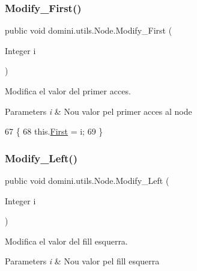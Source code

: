 \subsubsection{\texorpdfstring{Modify\+\_\+\+First()}{Modify\_First()}}
{\footnotesize\ttfamily public void domini.\+utils.\+Node.\+Modify\+\_\+\+First (\begin{DoxyParamCaption}\item[{Integer}]{i }\end{DoxyParamCaption})\hspace{0.3cm}{\ttfamily [inline]}}



Modifica el valor del primer acces. 


\begin{DoxyParams}{Parameters}
{\em i} & Nou valor pel primer acces al node \\
\hline
\end{DoxyParams}

\begin{DoxyCode}
67                                         \{
68         this.\hyperlink{classdomini_1_1utils_1_1Node_a42db9f259f129c72cab2052a0f8ba42a}{First} = i;
69     \}
\end{DoxyCode}
\mbox{\label{classdomini_1_1utils_1_1Node_a5a1cbd1e7f1fd78b42050f563520a709}} 
\subsubsection{\texorpdfstring{Modify\+\_\+\+Left()}{Modify\_Left()}}
{\footnotesize\ttfamily public void domini.\+utils.\+Node.\+Modify\+\_\+\+Left (\begin{DoxyParamCaption}\item[{Integer}]{i }\end{DoxyParamCaption})\hspace{0.3cm}{\ttfamily [inline]}}



Modifica el valor del fill esquerra. 


\begin{DoxyParams}{Parameters}
{\em i} & Nou valor pel fill esquerra \\
\hline
\end{DoxyParams}

